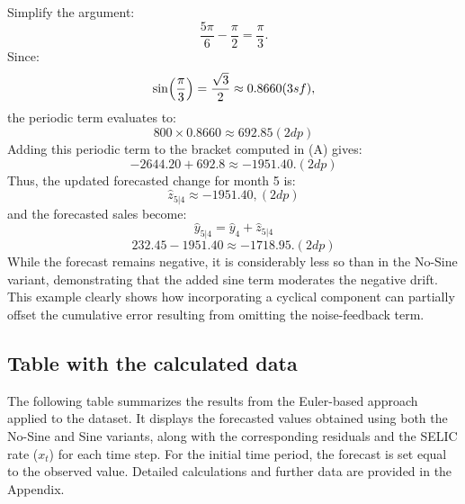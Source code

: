 \documentclass[10pt]{article}
\begin{document}
Simplify the argument:
\[
\frac{5\pi}{6} - \frac{\pi}{2} = \frac{\pi}{3}.
\]
Since:
\[
\sin\Bigl(\frac{\pi}{3}\Bigr) = \frac{\sqrt{3}}{2} \approx 0.8660 (3sf),
\]
the periodic term evaluates to:
\[
800 \times 0.8660 \approx 692.85(2dp)
\]
Adding this periodic term to the bracket computed in (A) gives:
\[
-2644.20 + 692.8 \approx -1951.40. (2dp)
\]
Thus, the updated forecasted change for month 5 is:
\[
\hat{z}_{5|4} \approx -1951.40, (2dp)
\]
and the forecasted sales become:
\[
\hat{y}_{5|4} = \hat{y}_4 + \hat{z}_{5|4}\] \[ 232.45 - 1951.40 \approx -1718.95. (2dp)
\]
While the forecast remains negative, it is considerably less so than in the No-Sine variant, demonstrating that the added sine term moderates the negative drift. This example clearly shows how incorporating a cyclical component can partially offset the cumulative error resulting from omitting the noise-feedback term.



\subsection{Table with the calculated data}

The following table summarizes the results from the Euler-based approach applied to the dataset. It displays the forecasted values obtained using both the No-Sine and Sine variants, along with the corresponding residuals and the SELIC rate (\(x_t\)) for each time step. For the initial time period, the forecast is set equal to the observed value. Detailed calculations and further data are provided in the Appendix.
\end{document}
